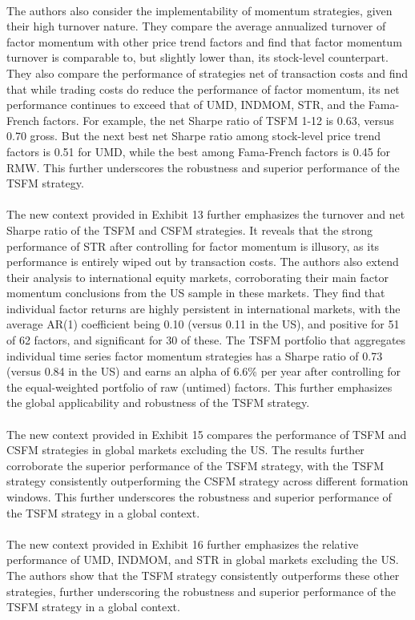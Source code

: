 \documentclass{article}
\begin{document}
\\
The authors also consider the implementability of momentum strategies, given their high turnover nature. They compare the average annualized turnover of factor momentum with other price trend factors and find that factor momentum turnover is comparable to, but slightly lower than, its stock-level counterpart. They also compare the performance of strategies net of transaction costs and find that while trading costs do reduce the performance of factor momentum, its net performance continues to exceed that of UMD, INDMOM, STR, and the Fama-French factors. For example, the net Sharpe ratio of TSFM 1-12 is 0.63, versus 0.70 gross. But the next best net Sharpe ratio among stock-level price trend factors is 0.51 for UMD, while the best among Fama-French factors is 0.45 for RMW. This further underscores the robustness and superior performance of the TSFM strategy. \\
\\
The new context provided in Exhibit 13 further emphasizes the turnover and net Sharpe ratio of the TSFM and CSFM strategies. It reveals that the strong performance of STR after controlling for factor momentum is illusory, as its performance is entirely wiped out by transaction costs. The authors also extend their analysis to international equity markets, corroborating their main factor momentum conclusions from the US sample in these markets. They find that individual factor returns are highly persistent in international markets, with the average AR(1) coefficient being 0.10 (versus 0.11 in the US), and positive for 51 of 62 factors, and significant for 30 of these. The TSFM portfolio that aggregates individual time series factor momentum strategies has a Sharpe ratio of 0.73 (versus 0.84 in the US) and earns an alpha of 6.6\% per year after controlling for the equal-weighted portfolio of raw (untimed) factors. This further emphasizes the global applicability and robustness of the TSFM strategy. \\
\\
The new context provided in Exhibit 15 compares the performance of TSFM and CSFM strategies in global markets excluding the US. The results further corroborate the superior performance of the TSFM strategy, with the TSFM strategy consistently outperforming the CSFM strategy across different formation windows. This further underscores the robustness and superior performance of the TSFM strategy in a global context. \\
\\
The new context provided in Exhibit 16 further emphasizes the relative performance of UMD, INDMOM, and STR in global markets excluding the US. The authors show that the TSFM strategy consistently outperforms these other strategies, further underscoring the robustness and superior performance of the TSFM strategy in a global context. \\
\end{document}
